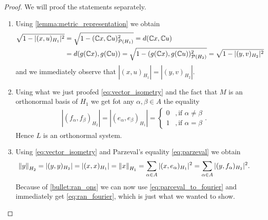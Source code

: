 \begin{proof}
	We will proof the statements separately.
	\begin{enumerate}
		\item Using \ref{lemma:metric_representation} we obtain
		\begin{align*}
			\sqrt{1 - |(x,u)_{H_1}|^2} &= \sqrt{1 - (\C x,\C u)_{\mathcal{P}(H_1)}^2} = d(\C x,\C u) \\
			&= d\pbraces{g(\C x), g(\C u)} = \sqrt{1 - (g(\C x), g(\C u))_{\mathcal{P}(H_2)}^2} = \sqrt{1 - |(y, v)_{H_2}|^2}
		\end{align*}
		and we immediately observe that $|(x,u)_{H_1}| = |(y,v)_{H_2}|$. 
		
		\item Using what we just proofed \eqref{eq:vector_isometry} and the fact that $M$ is an orthonormal basis of $H_1$ we get fot any $\alpha, \beta \in A$ the equality
		\begin{align*}
			|(f_\alpha, f_\beta)_{H_2}| = |(e_\alpha, e_\beta)_{H_1}| = 
			\begin{cases}
				0 &, \text{if } \alpha \neq \beta \\
				1 &, \text{if } \alpha = \beta
			\end{cases}.
		\end{align*}
		Hence $L$ is an orthonormal system.
		
		\item Using \eqref{eq:vector_isometry} and Parzeval's equality \eqref{eq:parzeval} we obtain
		\begin{align*}
			\norm[H_2]{y} = |(y,y)_{H_2}| = |(x,x)_{H_1}| = \norm[H_1]{x} = \sum_{\alpha \in A} |(x, e_\alpha)_{H_1}|^2 = \sum_{\alpha \in A} |(y, f_\alpha)_{H_2}|^2.
		\end{align*}
		Because of \ref{bullet:ran_ons} we can now use \eqref{eq:parceval_to_fourier} and immediately get \eqref{eq:ran_fourier}, which is just what we wanted to show.
	\end{enumerate}
\end{proof}